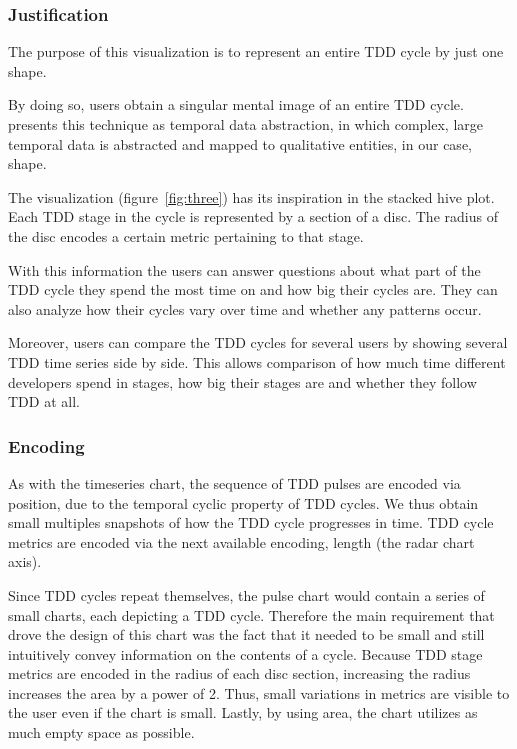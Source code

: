 \documentclass[journal]{vgtc}                %
\begin{document}
\subsubsection{Justification}

The purpose of this visualization is to represent an entire TDD cycle by just one shape. 

By doing so, users obtain a singular mental image of an entire TDD cycle.
\cite{one} presents this technique as temporal data abstraction, in which complex, large temporal data is abstracted and mapped to qualitative entities, in our case, shape.

The visualization (figure~\ref{fig:three}) has its inspiration in the stacked hive plot.
Each TDD stage in the cycle is represented by a section of a disc.
The radius of the disc encodes a certain metric pertaining to that stage.

With this information the users can answer questions about what part of the TDD cycle they spend the most time on and how big their cycles are. They can also analyze how their cycles vary over time and whether any patterns occur.

Moreover, users can compare the TDD cycles for several users by showing several TDD time series side by side. This allows comparison of how much time different developers spend in stages, how big their stages are and whether they follow TDD at all.

\subsubsection{Encoding}

As with the timeseries chart, the sequence of TDD pulses are encoded via position, due to the temporal cyclic property of TDD cycles. We thus obtain small multiples snapshots of how the TDD cycle progresses in time.
TDD cycle metrics are encoded via the next available encoding, length (the radar chart axis).

Since TDD cycles repeat themselves, the pulse chart would contain a series of small charts, each depicting a TDD cycle.
Therefore the main requirement that drove the design of this chart was the fact that it needed to be small and still intuitively convey information on the contents of a cycle.
Because TDD stage metrics are encoded in the radius of each disc section, increasing the radius increases the area by a power of 2.
Thus, small variations in metrics are visible to the user even if the chart is small.
Lastly, by using area, the chart utilizes as much empty space as possible.
\end{document}
